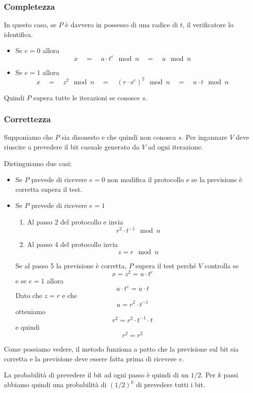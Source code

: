 \subsubsection{Completezza}
In questo caso, se $P$ \`e davvero in possesso di una radice di $t$, il verificatore lo identifica.
\begin{itemize}
	\item Se $e = 0$ allora
	      \[ x \quad = \quad u \cdot t^e \mod{n} \quad = \quad u \mod{n} \]
	\item Se $e = 1$ allora
	      \[ x \quad = \quad z^2 \mod{n} \quad = \quad (r \cdot s^e)^2 \mod{n} \quad = \quad u \cdot t \mod{n} \]
\end{itemize}
Quindi $P$ supera tutte le iterazioni se conosce $s$.

\subsubsection{Correttezza}
Supponiamo che $P$ sia disonesto e che quindi non conosca $s$. Per ingannare $V$ deve riuscire a prevedere il bit
casuale generato da $V$ ad ogni iterazione.

Distinguiamo due casi:
\begin{itemize}
	\item Se $P$ prevede di ricevere $e = 0$ non modifica il protocollo e se la previsione \`e corretta supera il
	      test.
	\item Se $P$ prevede di ricevere $e = 1$
	      \begin{enumerate}
		      \item Al passo 2 del protocollo e invia
		            \[ r^2 \cdot t^{-1} \mod{n} \]
		      \item Al passo 4 del protocollo invia
		            \[ z = r \mod{n} \]
	      \end{enumerate}
	      Se al passo 5 la previsione \`e corretta, $P$ supera il test perch\'e $V$ controlla se
	      \[ x = z^2 = u \cdot t^e \]
	      e se $e = 1$ allora
	      \[ u \cdot t^e = u \cdot t \]
	      Dato che $z = r$ e che
	      \[ u = r^2 \cdot t^{-1} \]
	      otteniamo
	      \[ r^2 = r^2 \cdot t^{-1} \cdot t \]
	      e quindi
	      \[ r^2 = r^2 \]
\end{itemize}
Come possiamo vedere, il metodo funziona a patto che la previsione sul bit sia corretta e la previsione deve essere
fatta prima di ricevere $e$.

La probabilit\`a di prevedere il bit ad ogni passo \`e quindi di un $1/2$. Per $k$ passi abbiamo quindi una
probabilit\`a di $(1/2)^k$ di prevedere tutti i bit.

